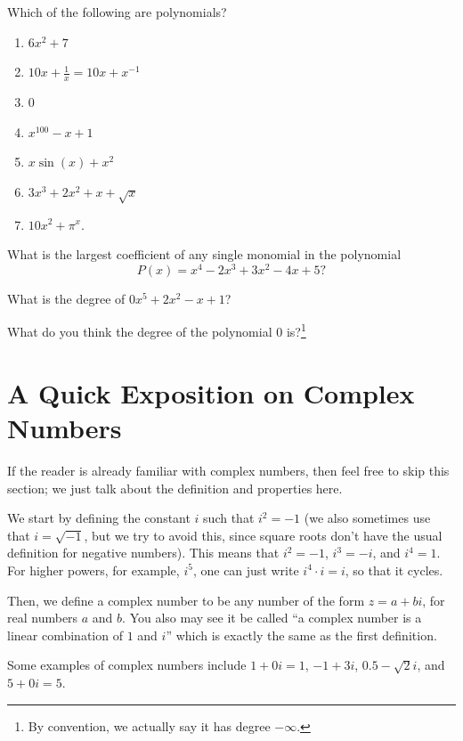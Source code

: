 \documentclass[11pt]{scrartcl}
\begin{document}
\begin{problem}[1]{}
Which of the following are polynomials?
\begin{enumerate}[label=\alph*)]
\item $6x^2+7$
\item $10x+\tfrac{1}{x} = 10x+x^{-1}$
\item $0$
\item $x^{100}-x+1$
\item $x\sin(x)+x^2$
\item $3x^3+2x^2+x+\sqrt{x}$
\item $10x^2+\pi^x$.
\end{enumerate}
\end{problem}
\begin{problem}[2]{}
What is the largest coefficient of any single monomial in the polynomial \[P(x) = x^4-2x^3+3x^2-4x+5?\]
\end{problem}
\begin{problem}[3]{}
What is the degree of $0x^5+2x^2-x+1$?
\end{problem}
\begin{problem}[4]{}
What do you think the degree of the polynomial $0$ is?\footnote{By convention, we actually say it has degree $-\infty$.}
\end{problem}

\newpage

\section{A Quick Exposition on Complex Numbers}

If the reader is already familiar with complex numbers, then feel free to skip this section; we just talk about the definition and properties here.

We start by defining the constant $i$ such that $i^2 = -1$ (we also sometimes use that $i = \sqrt{-1}$, but we try to avoid this, since square roots don't have the usual definition for negative numbers). This means that $i^2 = -1$, $i^3 = -i$, and $i^4 = 1$. For higher powers, for example, $i^5$, one can just write $i^4\cdot i = i$, so that it cycles.

Then, we define a complex number to be any number of the form $z = a+bi$, for real numbers $a$ and $b$. You also may see it be called ``a complex number is a linear combination of $1$ and $i$'' which is exactly the same as the first definition.

\begin{example*}
Some examples of complex numbers include $1+0i = 1$, $-1+3i$, $0.5-\sqrt{2}i$, and $5+0i = 5$.
\end{example*}
\end{document}
